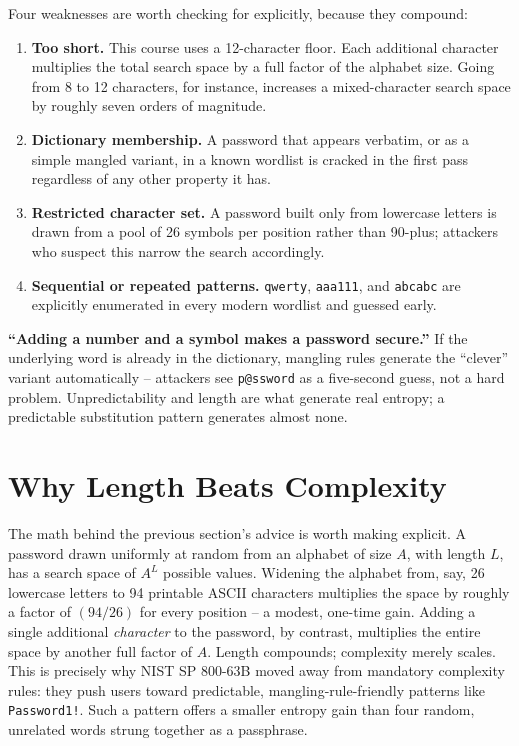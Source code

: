 Four weaknesses are worth checking for explicitly, because they compound:

\begin{enumerate}
\item \textbf{Too short.} This course uses a 12-character floor. Each additional character
multiplies the total search space by a full factor of the alphabet size. Going from 8 to 12
characters, for instance, increases a mixed-character search space by roughly seven orders of magnitude.
\item \textbf{Dictionary membership.} A password that appears verbatim, or as a simple mangled
variant, in a known wordlist is cracked in the first pass regardless of any other property it has.
\item \textbf{Restricted character set.} A password built only from lowercase letters is drawn
from a pool of 26 symbols per position rather than 90-plus; attackers who suspect this narrow the
search accordingly.
\item \textbf{Sequential or repeated patterns.} \texttt{qwerty}, \texttt{aaa111}, and
\texttt{abcabc} are explicitly enumerated in every modern wordlist and guessed early.
\end{enumerate}

\begin{misconception}
\textbf{``Adding a number and a symbol makes a password secure.''} If the underlying word is
already in the dictionary, mangling rules generate the ``clever'' variant automatically --
attackers see \texttt{p@ssword} as a five-second guess, not a hard problem. Unpredictability and
length are what generate real entropy; a predictable substitution pattern generates almost none.
\end{misconception}

\section{Why Length Beats Complexity}

The math behind the previous section's advice is worth making explicit. A password drawn
uniformly at random from an alphabet of size $A$, with length $L$, has a search space of $A^{L}$
possible values. Widening the alphabet from, say, 26 lowercase letters to 94 printable ASCII
characters multiplies the space by roughly a factor of $(94/26)$ for every position -- a modest,
one-time gain. Adding a single additional \emph{character} to the password, by contrast,
multiplies the entire space by another full factor of $A$. Length compounds; complexity merely
scales. This is precisely why NIST SP 800-63B moved away from mandatory complexity rules: they
push users toward predictable, mangling-rule-friendly patterns like \texttt{Password1!}. Such a
pattern offers a smaller entropy gain than four random, unrelated words strung together as a
passphrase.

